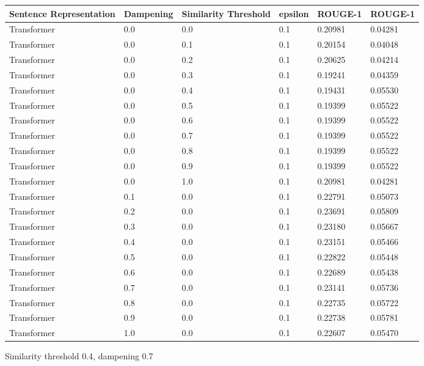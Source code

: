 \documentclass[11pt,a4paper]{article}
\begin{document}
\begin{table}[h]
\begin{tabular}{|l|l|l|l|l|l|} \hline
\textbf{Sentence Representation} & \textbf{Dampening} & \textbf{Similarity Threshold} & \textbf{epsilon} & \textbf{ROUGE-1} & \textbf{ROUGE-1}\\ \hline
Transformer & 0.0 & 0.0 & 0.1 & 0.20981 & 0.04281 \\ \hline
Transformer & 0.0 & 0.1 & 0.1 & 0.20154 & 0.04048 \\ \hline
Transformer & 0.0 & 0.2 & 0.1 & 0.20625 & 0.04214 \\ \hline
Transformer & 0.0 & 0.3 & 0.1 & 0.19241 & 0.04359 \\ \hline
Transformer & 0.0 & 0.4 & 0.1 & 0.19431 & 0.05530 \\ \hline
Transformer & 0.0 & 0.5 & 0.1 & 0.19399 & 0.05522 \\ \hline
Transformer & 0.0 & 0.6 & 0.1 & 0.19399 & 0.05522 \\ \hline
Transformer & 0.0 & 0.7 & 0.1 & 0.19399 & 0.05522\\ \hline
Transformer & 0.0 & 0.8 & 0.1 & 0.19399 & 0.05522 \\ \hline
Transformer & 0.0 & 0.9 & 0.1 & 0.19399 & 0.05522 \\ \hline
Transformer & 0.0 & 1.0 & 0.1 & 0.20981 & 0.04281 \\ \hline
Transformer & 0.1 & 0.0 & 0.1 & 0.22791 & 0.05073 \\ \hline
Transformer & 0.2 & 0.0 & 0.1 & 0.23691 & 0.05809 \\ \hline
Transformer & 0.3 & 0.0 & 0.1 & 0.23180 & 0.05667 \\ \hline
Transformer & 0.4 & 0.0 & 0.1 & 0.23151 & 0.05466 \\ \hline
Transformer & 0.5 & 0.0 & 0.1 & 0.22822 & 0.05448 \\ \hline
Transformer & 0.6 & 0.0 & 0.1 & 0.22689 & 0.05438 \\ \hline
Transformer & 0.7 & 0.0 & 0.1 & 0.23141 & 0.05736 \\ \hline
Transformer & 0.8 & 0.0 & 0.1 & 0.22735 & 0.05722 \\ \hline
Transformer & 0.9 & 0.0 & 0.1 & 0.22738 & 0.05781 \\ \hline
Transformer & 1.0 & 0.0 & 0.1 & 0.22607 & 0.05470 \\ \hline
\end{tabular}
\label{table:2}
\end{table}

Similarity threshold 0.4, dampening 0.7
\end{document}
